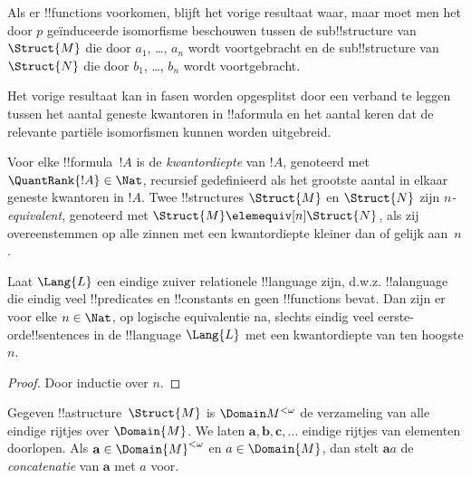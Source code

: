 \documentclass[openany]{memoir}
\begin{document}
\begin{rem}
Als er !!{function}s voorkomen, blijft het vorige resultaat waar, maar
moet men het door $p$ geïnduceerde isomorfisme beschouwen tussen de
sub!!{structure} van $\Struct{M}$ die door $a_1$, \dots, $a_n$ wordt
voortgebracht en de sub!!{structure} van $\Struct{N}$ die door
$b_1$, \dots, $b_n$ wordt voortgebracht.
\end{rem}

Het vorige resultaat kan in fasen worden opgesplitst door een verband te
leggen tussen het aantal geneste kwantoren in !!a{formula} en het aantal
keren dat de relevante partiële isomorfismen kunnen worden uitgebreid.

\begin{defn}
  Voor elke !!{formula}~$!A$ is de \emph{kwantordiepte} van $!A$,
  genoteerd met $\QuantRank{!A} \in \Nat$, recursief gedefinieerd als
  het grootste aantal in elkaar geneste kwantoren in $!A$. Twee
  !!{structure}s $\Struct{M}$ en $\Struct{N}$ zijn
  \emph{$n$-equivalent}, genoteerd met
  $\Struct{M} \elemequiv[n] \Struct{N}$, als zij overeenstemmen op alle
  zinnen met een kwantordiepte kleiner dan of gelijk aan~$n$.
\end{defn}

\begin{prop}
  Laat $\Lang{L}$ een eindige zuiver relationele !!{language} zijn,
  d.w.z. !!a{language} die eindig veel !!{predicate}s en
  !!{constant}s en geen !!{function}s bevat. Dan zijn er voor elke
  $n \in \Nat$, op logische equivalentie na, slechts eindig veel
  eerste-orde!!{sentence}s in de !!{language} $\Lang{L}$ met een
  kwantordiepte van ten hoogste $n$.
\end{prop}

\begin{proof}
  Door inductie over $n$.
\end{proof}

\begin{defn}
  Gegeven !!a{structure}~$\Struct{M}$ is $\Domain M^{<\omega}$ de
  verzameling van alle eindige rijtjes over $\Domain{M}$. We laten
  $\mathbf{a}, \mathbf{b}, \mathbf{c}, \ldots$ eindige rijtjes van
  elementen doorlopen. Als $\mathbf{a} \in \Domain{M}^{<\omega}$ en
  $a \in \Domain{M}$, dan stelt $\mathbf{a}a$ de
  \emph{concatenatie} van $\mathbf{a}$ met $a$ voor.
\end{defn}
\end{document}
